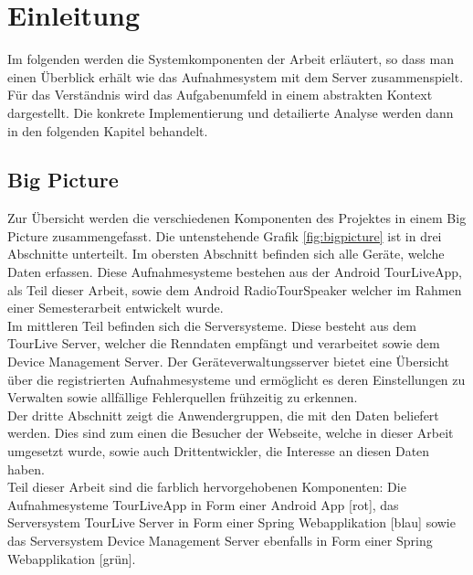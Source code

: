 \chapter{Einleitung}

Im folgenden werden die Systemkomponenten der Arbeit erläutert, so dass man einen Überblick erhält wie das Aufnahmesystem mit dem Server zusammenspielt. Für das Verständnis wird das Aufgabenumfeld in einem abstrakten Kontext dargestellt. Die konkrete Implementierung und detailierte Analyse werden dann in den folgenden Kapitel behandelt.

\section{Big Picture}
Zur Übersicht werden die verschiedenen Komponenten des Projektes in einem Big Picture zusammengefasst. Die untenstehende Grafik \ref{fig:bigpicture} ist in drei Abschnitte unterteilt. Im obersten Abschnitt befinden sich alle Geräte, welche Daten erfassen. Diese Aufnahmesysteme bestehen aus der Android TourLiveApp, als Teil dieser Arbeit, sowie dem Android RadioTourSpeaker welcher im Rahmen einer Semesterarbeit \cite{radiotourspeaker2012} entwickelt wurde.\\

Im mittleren Teil befinden sich die Serversysteme. Diese besteht aus dem TourLive Server, welcher die Renndaten empfängt und verarbeitet sowie dem Device Management Server. Der Geräteverwaltungsserver bietet eine Übersicht über die registrierten Aufnahmesysteme und ermöglicht es deren Einstellungen zu Verwalten sowie allfällige Fehlerquellen frühzeitig zu erkennen.\\

Der dritte Abschnitt zeigt die Anwendergruppen, die mit den Daten beliefert werden. Dies sind zum einen die Besucher der Webseite, welche in dieser Arbeit umgesetzt wurde, sowie auch Drittentwickler, die Interesse an diesen Daten haben.\\

Teil dieser Arbeit sind die farblich hervorgehobenen Komponenten: Die Aufnahmesysteme TourLiveApp in Form einer Android App [rot], das Serversystem TourLive Server in Form einer Spring Webapplikation [blau] sowie das Serversystem Device Management Server ebenfalls in Form einer Spring Webapplikation [grün].

